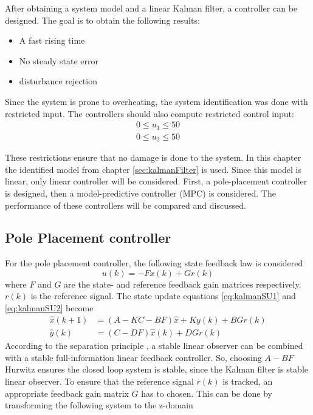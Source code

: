 After obtaining a system model and a linear Kalman filter, a controller can be designed. The goal is to obtain the following results:
\begin{itemize}
    \item A fast rising time
    \item No steady state error
    \item disturbance rejection
\end{itemize}
Since the system is prone to overheating, the system identification was done with restricted input. The controllers should also compute restricted control input:
\begin{align}
    0\leq u_1 \leq 50 \label{eq:controleffort1} \\
    0\leq u_2 \leq 50 \label{eq:controleffort2}
\end{align}
    
These restrictions ensure that no damage is done to the system.
In this chapter the identified model from chapter \ref{sec:kalmanFilter} is used. Since this model is linear, only linear controller will be considered. First, a pole-placement controller is designed, then a model-predictive controller (MPC) is considered. The performance of these controllers will be compared and discussed.
\subsection{Pole Placement controller}
For the pole placement controller, the following state feedback law is considered
$$
u(k) = -Fx(k) + Gr(k)
$$
where $F$ and $G$ are the state- and reference feedback gain matrices respectively. $r(k)$ is the reference signal. The state update equations \ref{eq:kalmanSU1} and \ref{eq:kalmanSU2} become
\begin{align*}
    \hat{x}(k+1) &= (A-KC-BF)\hat{x} + Ky(k) +BGr(k)\\
    \hat{y}(k) &= (C-DF)\hat{x}(k) + DGr(k) 
\end{align*}
According to the separation principle \cite{controlTheory}, a stable linear observer can be combined with a stable full-information linear feedback controller. So, choosing $A-BF$ Hurwitz ensures the closed loop system is stable, since the Kalman filter is stable linear observer. To ensure that the reference signal $r(k)$ is tracked, an appropriate feedback gain matrix $G$ has to chosen. This can be done by transforming the following system to the z-domain

